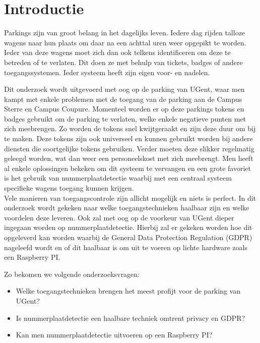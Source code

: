 
\section{Introductie} %
\label{sec:introductie}

Parkings zijn van groot belang in het dagelijks leven. Iedere dag rijden talloze wagens naar hun plaats om daar na een achttal uren weer opgepikt te worden. Ieder van deze wagens moet zich dan ook telkens identificeren om deze te betreden of te verlaten. Dit doen ze met behulp van tickets, badges of andere toegangssystemen. Ieder systeem heeft zijn eigen voor- en nadelen.

Dit onderzoek wordt uitgevoerd met oog op de parking van UGent, waar men kampt met enkele problemen met de toegang van de parking aan de Campus Sterre en Campus Coupure. Momenteel worden er op deze parkings tokens en badges gebruikt om de parking te verlaten, welke enkele negatieve punten met zich meebrengen. Zo worden de tokens snel kwijtgeraakt en zijn deze duur om bij te maken. Deze tokens zijn ook universeel en kunnen gebruikt worden bij andere diensten die soortgelijke tokens gebruiken. Verder moeten deze slikker regelmatig geleegd worden, wat dan weer een personeelskost met zich meebrengt. Men heeft al enkele oplossingen bekeken om dit systeem te vervangen en een grote favoriet is het gebruik van nummerplaatdetectie waarbij met een centraal systeem specifieke wagens toegang kunnen krijgen.
\\
Vele manieren van toegangscontrole zijn allicht mogelijk en niets is perfect. In dit onderzoek wordt gekeken naar welke toegangstechnieken haalbaar zijn en welke voordelen deze leveren. Ook zal met oog op de voorkeur van UGent dieper ingegaan worden op nummerplaatdetectie. Hierbij zal er gekeken worden hoe dit opgeleverd kan worden waarbij de General Data Protection Regulation (GDPR) nageleefd wordt en of dit haalbaar is om uit te voeren op lichte hardware zoals een Raspberry PI.

Zo bekomen we volgende onderzoeksvragen:
\begin{itemize}
  \item Welke toegangstechnieken brengen het meest profijt voor de parking van UGent?
  \item Is nummerplaatdetectie een haalbare techniek omtrent privacy en GDPR?
  \item Kan men nummerplaatdetectie uitvoeren op een Raspberry PI?
\end{itemize}

